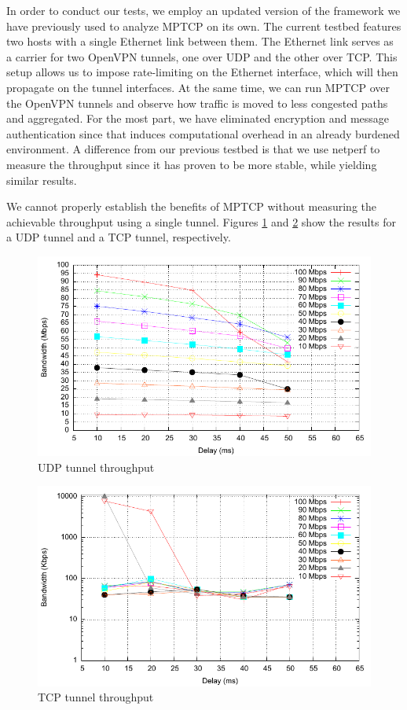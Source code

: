 
In order to conduct our tests, we employ an updated version of the framework
we have previously used to analyze MPTCP on its own\cite{sem1}. The current
testbed features two hosts with a single Ethernet link between them. The
Ethernet link serves as a carrier for two OpenVPN tunnels, one over UDP and
the other over TCP. This setup allows us to impose rate-limiting on the Ethernet
interface, which will then propagate on the tunnel interfaces. At the same
time, we can run MPTCP over the OpenVPN tunnels and observe how traffic is
moved to less congested paths and aggregated. For the most part, we have
eliminated encryption and message authentication since that induces
computational overhead in an already burdened environment. A difference from
our previous testbed is that we use netperf to measure the throughput since it
has proven to be more stable, while yielding similar results.

We cannot properly establish the benefits of MPTCP without measuring the
achievable throughput using a single tunnel. Figures \ref{fig:udp} and
\ref{fig:tcp} show the results for a UDP tunnel and a TCP tunnel,
respectively.

\begin{figure}
  \centering
  \includegraphics[width=\textwidth]{img/test-udp}
  \caption{UDP tunnel throughput}
  \label{fig:udp}
\end{figure}

\begin{figure}
  \centering
  \includegraphics[width=\textwidth]{img/test-tcp}
  \caption{TCP tunnel throughput}
  \label{fig:tcp}
\end{figure}

